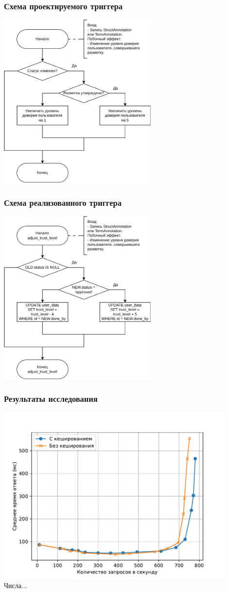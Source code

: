 \documentclass{beamer}
\begin{document}
\begin{frame}
    \frametitle{Схема проектируемого триггера}
    \centering
	\includegraphics[width=0.6\textwidth]{diag/trig-v4.pdf}
\end{frame}

\begin{frame}
    \frametitle{Схема реализованного триггера}
    \centering
	\includegraphics[width=0.6\textwidth]{diag/tech-trig-v4.pdf}
\end{frame}

\begin{frame}
    \frametitle{Результаты исследования}
    \centering
	\includegraphics[width=0.9\textwidth]{img/avg-resp-time.pdf}
    Числа...
\end{frame}
\end{document}
